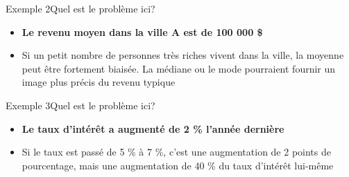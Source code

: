 \documentclass[xcolor=dvipsnames, onlymath, 10pt, aspectratio=169, handout]{beamer}
\begin{document}


%
%
%


\begin{frame}{Exemple 2}{Quel est le problème ici?}


	\begin{important}
		\begin{itemize}
			\item[] \textbf{Le revenu moyen dans la ville A est de 100 000 \$}
			      \pause
			\item[\winner] Si un petit nombre de personnes très riches vivent dans la ville, la moyenne peut être fortement biaisée. La médiane ou le mode pourraient fournir un image plus précis du revenu typique
		\end{itemize}
	\end{important}

\end{frame}


\begin{frame}{Exemple 3}{Quel est le problème ici?}


	\begin{important}
		\begin{itemize}
			\item[] \textbf{Le taux d'intérêt a augmenté de 2 \% l'année dernière}
			      \pause
			\item[\winner] Si le taux est passé de 5 \% à 7 \%, c'est une augmentation de 2 points de pourcentage, mais une augmentation de 40 \% du taux d'intérêt lui-même
		\end{itemize}
	\end{important}

\end{frame}
\end{document}
